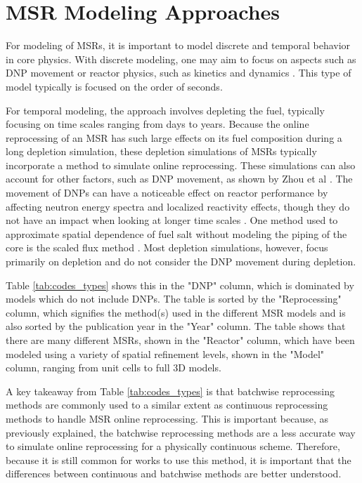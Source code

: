 \section{MSR Modeling Approaches}

For modeling of MSRs, it is important to model discrete and temporal behavior in core physics.
With discrete modeling, one may aim to focus on aspects such as DNP movement \cite{fei_molten_2020, shi_gen-foam_2021} or reactor physics, such as kinetics and dynamics \cite{singh_plant-level_2020, cervi_development_2019, aufiero_development_2014, cui_development_2022, singh_dynamics_2017}.
This type of model typically is focused on the order of seconds.

For temporal modeling, the approach involves depleting the fuel, typically focusing on time scales ranging from days to years. Because the online reprocessing of an MSR has such large effects on its fuel composition during a long depletion simulation, these depletion simulations of MSRs typically incorporate a method to simulate online reprocessing.
These simulations can also account for other factors, such as DNP movement, as shown by Zhou et al \cite{zhou_fuel_2018}.
The movement of DNPs can have a noticeable effect on reactor performance by affecting neutron energy spectra and localized reactivity effects, though they do not have an impact when looking at longer time scales \cite{betzler_implementation_2017}.
One method used to approximate spatial dependence of fuel salt without modeling the piping of the core is the scaled flux method \cite{betzler_liquid-fueled_2021}.
Most depletion simulations, however, focus primarily on depletion and do not consider the DNP movement during depletion.

Table \ref{tab:codes_types} shows this in the "DNP" column, which is dominated by models which do not include DNPs.
The table is sorted by the "Reprocessing" column, which signifies the method(s) used in the different MSR models and is also sorted by the publication year in the "Year" column.
The table shows that there are many different MSRs, shown in the "Reactor" column, which have been modeled using a variety of spatial refinement levels, shown in the "Model" column, ranging from unit cells to full 3D models.

A key takeaway from Table \ref{tab:codes_types} is that batchwise reprocessing methods are commonly used to a similar extent as continuous reprocessing methods to handle MSR online reprocessing.
This is important because, as previously explained, the batchwise reprocessing methods are a less accurate way to simulate online reprocessing for a physically continuous scheme.
Therefore, because it is still common for works to use this method, it is important that the differences between continuous and batchwise methods are better understood.


